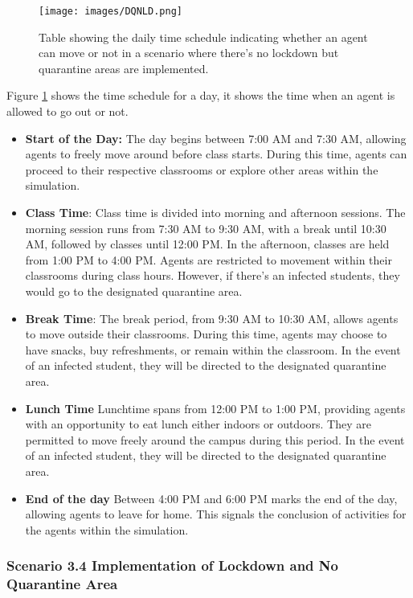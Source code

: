 \begin{figure}[H]
	\centering
	\texttt{[image: images/DQNLD.png]}
	\caption{Table showing the daily time schedule indicating whether an agent can move or not in a scenario where there's no lockdown but quarantine areas are implemented.}
	\label{3.2c} 
\end{figure}

Figure \ref{3.2c} shows the time schedule for a day, it shows the time when an agent is allowed to go out or not.


\begin{itemize}
	\item \textbf{Start of the Day:} The day begins between 7:00 AM and 7:30 AM, allowing agents to freely move around before class starts. During this time, agents can proceed to their respective classrooms or explore other areas within the simulation. 
	
	\item \textbf{Class Time}: Class time is divided into morning and afternoon sessions. The morning session runs from 7:30 AM to 9:30 AM, with a break until 10:30 AM, followed by classes until 12:00 PM. In the afternoon, classes are held from 1:00 PM to 4:00 PM. Agents are restricted to movement within their classrooms during class hours. However, if there's an infected students, they would go to the designated quarantine area.
	
	\item \textbf{Break Time}: The break period, from 9:30 AM to 10:30 AM, allows agents to move outside their classrooms. During this time, agents may choose to have snacks, buy refreshments, or remain within the classroom. In the event of an infected student, they will be directed to the designated quarantine area.
	
	\item \textbf{Lunch Time} Lunchtime spans from 12:00 PM to 1:00 PM, providing agents with an opportunity to eat lunch either indoors or outdoors. They are permitted to move freely around the campus during this period. In the event of an infected student, they will be directed to the designated quarantine area.
	
	\item \textbf{End of the day} Between 4:00 PM and 6:00 PM marks the end of the day, allowing agents to leave for home. This signals the conclusion of activities for the agents within the simulation.
\end{itemize}
	
\subsubsection{ Scenario 3.4 Implementation of Lockdown and No Quarantine Area}

